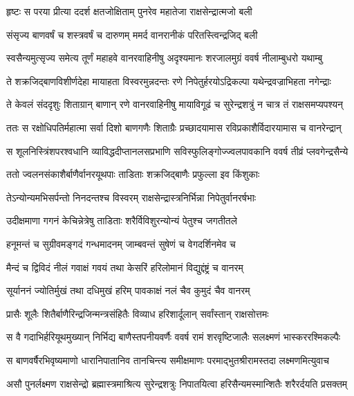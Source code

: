 \twolineshloka
{हृष्टः स परया प्रीत्या ददर्श क्षतजोक्षिताम्}
{पुनरेव महातेजा राक्षसेन्द्रात्मजो बली} %

\twolineshloka
{संसृज्य बाणवर्षं च शस्त्रवर्षं च दारुणम्}
{ममर्द वानरानीकं परितस्त्विन्द्रजिद् बली} %

\twolineshloka
{स्वसैन्यमुत्सृज्य समेत्य तूर्णं महाहवे वानरवाहिनीषु}
{अदृश्यमानः शरजालमुग्रं ववर्ष नीलाम्बुधरो यथाम्बु} %

\twolineshloka
{ते शक्रजिद्बाणविशीर्णदेहा मायाहता विस्वरमुन्नदन्तः}
{रणे निपेतुर्हरयोऽद्रिकल्पा यथेन्द्रवज्राभिहता नगेन्द्राः} %

\twolineshloka
{ते केवलं संददृशुः शिताग्रान् बाणान् रणे वानरवाहिनीषु}
{मायाविगूढं च सुरेन्द्रशत्रुं न चात्र तं राक्षसमप्यपश्यन्} %

\twolineshloka
{ततः स रक्षोधिपतिर्महात्मा सर्वा दिशो बाणगणैः शिताग्रैः}
{प्रच्छादयामास रविप्रकाशैर्विदारयामास च वानरेन्द्रान्} %

\twolineshloka
{स शूलनिस्त्रिंशपरश्वधानि व्याविद्धदीप्तानलसप्रभाणि}
{सविस्फुलिङ्गोज्ज्वलपावकानि ववर्ष तीव्रं प्लवगेन्द्रसैन्ये} %

\twolineshloka
{ततो ज्वलनसंकाशैर्बाणैर्वानरयूथपाः}
{ताडिताः शक्रजिद्बाणैः प्रफुल्ला इव किंशुकाः} %

\twolineshloka
{तेऽन्योन्यमभिसर्पन्तो निनदन्तश्च विस्वरम्}
{राक्षसेन्द्रास्त्रनिर्भिन्ना निपेतुर्वानरर्षभाः} %

\twolineshloka
{उदीक्षमाणा गगनं केचिन्नेत्रेषु ताडिताः}
{शरैर्विविशुरन्योन्यं पेतुश्च जगतीतले} %

\twolineshloka
{हनूमन्तं च सुग्रीवमङ्गदं गन्धमादनम्}
{जाम्बवन्तं सुषेणं च वेगदर्शिनमेव च} %

\twolineshloka
{मैन्दं च द्विविदं नीलं गवाक्षं गवयं तथा}
{केसरिं हरिलोमानं विद्युद्दंष्ट्रं च वानरम्} %

\twolineshloka
{सूर्याननं ज्योतिर्मुखं तथा दधिमुखं हरिम्}
{पावकाक्षं नलं चैव कुमुदं चैव वानरम्} %

\twolineshloka
{प्रासैः शूलैः शितैर्बाणैरिन्द्रजिन्मन्त्रसंहितैः}
{विव्याध हरिशार्दूलान् सर्वांस्तान् राक्षसोत्तमः} %

\twolineshloka
{स वै गदाभिर्हरियूथमुख्यान् निर्भिद्य बाणैस्तपनीयवर्णैः}
{ववर्ष रामं शरवृष्टिजालैः सलक्ष्मणं भास्कररश्मिकल्पैः} %

\twolineshloka
{स बाणवर्षैरभिवृष्यमाणो धारानिपातानिव तानचिन्त्य}
{समीक्षमाणः परमाद्भुतश्रीरामस्तदा लक्ष्मणमित्युवाच} %

\twolineshloka
{असौ पुनर्लक्ष्मण राक्षसेन्द्रो ब्रह्मास्त्रमाश्रित्य सुरेन्द्रशत्रुः}
{निपातयित्वा हरिसैन्यमस्मान्शितैः शरैरर्दयति प्रसक्तम्} %

